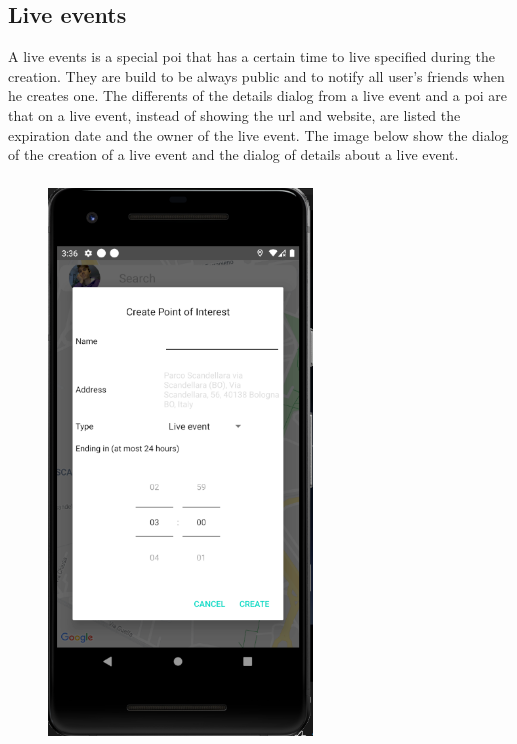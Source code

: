 \documentclass[../../main]{subfiles}
\begin{document}
\newpage
\subsection{Live events}
\label{ss:final-live}
A live events is a special poi that has a certain time to live specified during the creation. They are build to be always public and to notify 
all user's friends when he creates one. The differents of the details dialog from a live event and a poi are that on a live event, instead of showing 
the url and website, are listed the expiration date and the owner of the live event. The image below show the dialog of the creation of a live event and the dialog of details about a live event.
\begin{figure}[H]
    \centering
    \includegraphics[width=70mm,height=150mm]{images/app/live/creazione_live.png}

\end{figure}
\end{document}
